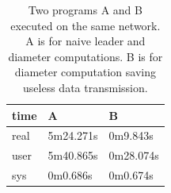 \begin{table}[htb]
\begin{center}
\begin{tabular}{|l|l|l|}\hline 
time &  A & B \\\hline
real &  5m24.271s &     0m9.843s\\\hline
user &  5m40.865s &     0m28.074s\\\hline
sys  &  0m0.686s  &     0m0.674s\\\hline
\end{tabular}
\caption{ Two programs A and B executed on the same network. A is for naive
leader and diameter computations. B is for diameter computation saving useless
data transmission. }
\label{tab:uneTableBench}
\end{center}
\end{table}































